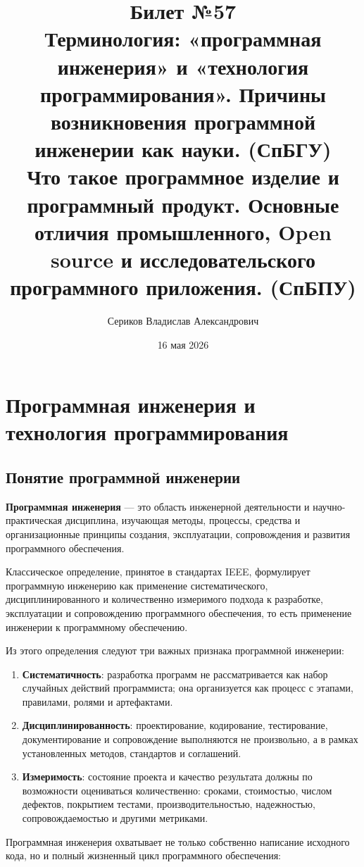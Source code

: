\documentclass[12pt,a4paper]{article}
\title{Билет №57 \\ \small Терминология: «программная инженерия» и «технология программирования». Причины возникновения программной инженерии как науки. (СпБГУ) \\ Что такое программное изделие и программный продукт. Основные отличия промышленного, Open source и исследовательского программного приложения. (СпБПУ)}
\author{Сериков Владислав Александрович}
\date{16 мая 2026}
\begin{document}
\maketitle
\tableofcontents
\newpage

\section{Программная инженерия и технология программирования}

\subsection{Понятие программной инженерии}

\textbf{Программная инженерия} --- это область инженерной деятельности и научно-практическая дисциплина, изучающая методы, процессы, средства и организационные принципы создания, эксплуатации, сопровождения и развития программного обеспечения.

Классическое определение, принятое в стандартах IEEE, формулирует программную инженерию как применение систематического, дисциплинированного и количественно измеримого подхода к разработке, эксплуатации и сопровождению программного обеспечения, то есть применение инженерии к программному обеспечению.

Из этого определения следуют три важных признака программной инженерии:

\begin{enumerate}
    \item \textbf{Систематичность}: разработка программ не рассматривается как набор случайных действий программиста; она организуется как процесс с этапами, правилами, ролями и артефактами.

    \item \textbf{Дисциплинированность}: проектирование, кодирование, тестирование, документирование и сопровождение выполняются не произвольно, а в рамках установленных методов, стандартов и соглашений.

    \item \textbf{Измеримость}: состояние проекта и качество результата должны по возможности оцениваться количественно: сроками, стоимостью, числом дефектов, покрытием тестами, производительностью, надежностью, сопровождаемостью и другими метриками.
\end{enumerate}

Программная инженерия охватывает не только собственно написание исходного кода, но и полный жизненный цикл программного обеспечения:
\end{document}
